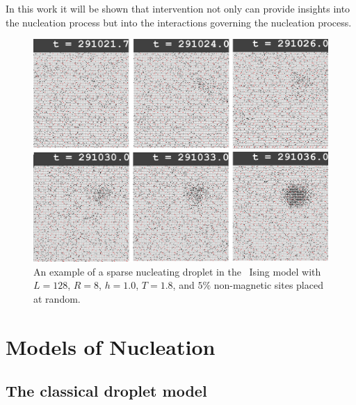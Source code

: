 In this work it will be shown that intervention not only can provide insights into the nucleation process but into the interactions governing the nucleation process.%
\begin{figure}[!h]
      \includegraphics[scale=0.20]{Images/IsingSequence.png}
    \caption{An example of  a sparse nucleating droplet in the \lr\ Ising model with $L=128$, $R=8$, $h=1.0$, $T=1.8$, and $5\%$ non-magnetic  sites placed at random.}
  \label{fig:sequence}
\end{figure}%
\section{Models of Nucleation}

\subsection{The classical droplet model}

